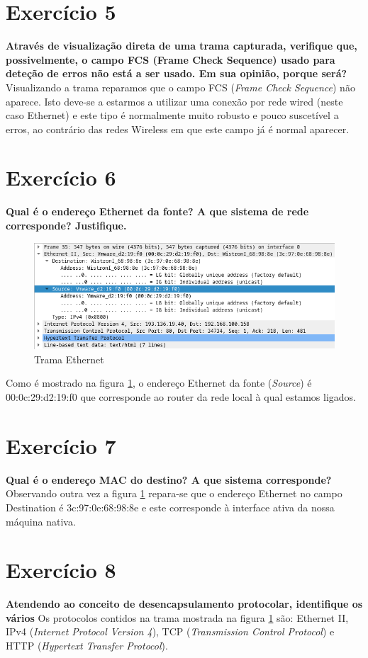 \documentclass[a4paper]{report}
\begin{document}
\section{Exercício 5}
\textbf{Através de visualização direta de uma trama capturada, verifique que,
possivelmente, o campo FCS (Frame Check Sequence) usado para deteção de erros
não está a ser usado. Em sua opinião, porque será?}
Visualizando a trama reparamos que o campo FCS (\textit{Frame Check Sequence})
não aparece. Isto deve-se a estarmos a utilizar uma conexão por rede wired
(neste caso Ethernet) e este tipo é normalmente muito robusto e pouco suscetível
a erros, ao contrário das redes Wireless em que este campo já é normal aparecer.

\section{Exercício 6}
\textbf{Qual é o endereço Ethernet da fonte? A que sistema de rede corresponde?
Justifique.}

\begin{figure}[H]
    \centering 
    \includegraphics[width=\textwidth]{images/678.png}
    \caption{Trama Ethernet}
    \label{fig:678}
\end{figure}
Como é mostrado na figura \ref{fig:678}, o endereço Ethernet da fonte
(\textit{Source}) é 00:0c:29:d2:19:f0 que corresponde ao router da rede local
à qual estamos ligados.

\section{Exercício 7}
\textbf{Qual é o endereço MAC do destino? A que sistema corresponde?}
Observando outra vez a figura \ref{fig:678} repara-se que o endereço Ethernet
no campo Destination é 3c:97:0e:68:98:8e e este corresponde à interface ativa da
nossa máquina nativa.

\section{Exercício 8}
\textbf{Atendendo ao conceito de desencapsulamento protocolar, identifique os
vários}
Os protocolos contidos na trama mostrada na figura \ref{fig:678} são: Ethernet
II, IPv4 (\textit{Internet Protocol Version 4}), TCP (\textit{Transmission
Control Protocol}) e HTTP (\textit{Hypertext Transfer Protocol}).
\end{document}
